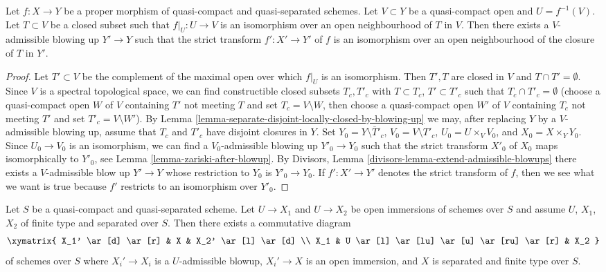 \begin{lemma}
\label{lemma-blowup-iso-along}
Let $f : X \to Y$ be a proper morphism of quasi-compact and
quasi-separated schemes. Let $V \subset Y$ be a quasi-compact open
and $U = f^{-1}(V)$. Let $T \subset V$ be a closed subset such that
$f|_U : U \to V$ is an isomorphism over an open neighbourhood of $T$
in $V$. Then there exists a $V$-admissible blowing up $Y' \to Y$
such that the strict transform $f' : X' \to Y'$ of $f$
is an isomorphism over an open neighbourhood of the closure
of $T$ in $Y'$.
\end{lemma}

\begin{proof}
Let $T' \subset V$ be the complement of the maximal open over which
$f|_U$ is an isomorphism. Then $T', T$ are closed in $V$ and
$T \cap T' = \emptyset$. Since $V$ is a spectral topological
space, we can find constructible closed subsets $T_c, T'_c$
with $T \subset T_c$, $T' \subset T'_c$ such that
$T_c \cap T'_c = \emptyset$ (choose a quasi-compact
open $W$ of $V$ containing $T'$ not meeting $T$
and set $T_c = V \setminus W$, then choose a quasi-compact
open $W'$ of $V$ containing $T_c$ not meeting $T'$
and set $T'_c = V \setminus W'$).
By Lemma \ref{lemma-separate-disjoint-locally-closed-by-blowing-up}
we may, after replacing $Y$ by a $V$-admissible blowing up,
assume that $T_c$ and $T'_c$ have disjoint closures in $Y$.
Set $Y_0 = Y \setminus \overline{T}'_c$, $V_0 = V \setminus T'_c$,
$U_0 = U \times_V V_0$, and $X_0 = X \times_Y Y_0$.
Since $U_0 \to V_0$ is an isomorphism, we can find a
$V_0$-admissible blowing up $Y'_0 \to Y_0$ such that the
strict transform $X'_0$ of $X_0$ maps isomorphically to $Y'_0$, see
Lemma \ref{lemma-zariski-after-blowup}.
By Divisors, Lemma \ref{divisors-lemma-extend-admissible-blowups}
there exists a $V$-admissible blow up $Y' \to Y$ whose restriction
to $Y_0$ is $Y'_0 \to Y_0$. If $f' : X' \to Y'$ denotes the
strict transform of $f$, then we see what we want is true because
$f'$ restricts to an isomorphism over $Y'_0$.
\end{proof}

\begin{lemma}
\label{lemma-find-common-blowups}
Let $S$ be a quasi-compact and quasi-separated scheme.
Let $U \to X_1$ and $U \to X_2$ be open immersions
of schemes over $S$ and assume $U$, $X_1$, $X_2$ of finite
type and separated over $S$. Then there exists a commutative diagram
$$
\xymatrix{
X_1' \ar[d] \ar[r] & X & X_2' \ar[l] \ar[d] \\
X_1 & U \ar[l] \ar[lu] \ar[u] \ar[ru] \ar[r] & X_2
}
$$
of schemes over $S$ where $X_i' \to X_i$ is a $U$-admissible
blowup, $X_i' \to X$ is an open immersion, and $X$ is separated and finite
type over $S$.
\end{lemma}

